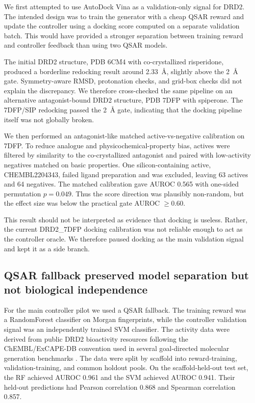 \documentclass[referee,lineno,pdflatex,sn-basic]{sn-jnl}
\theoremstyle{thmstyleone}%
\theoremstyle{thmstyletwo}%
\theoremstyle{thmstylethree}%
\begin{document}
We first attempted to use AutoDock Vina as a validation-only signal for DRD2. The intended design was to train the generator with a cheap QSAR reward and update the controller using a docking score computed on a separate validation batch. This would have provided a stronger separation between training reward and controller feedback than using two QSAR models.

The initial DRD2 structure, PDB 6CM4 with co-crystallized risperidone, produced a borderline redocking result around 2.33~\AA, slightly above the 2~\AA{} gate. Symmetry-aware RMSD, protonation checks, and grid-box checks did not explain the discrepancy. We therefore cross-checked the same pipeline on an alternative antagonist-bound DRD2 structure, PDB 7DFP with spiperone. The 7DFP/SIP redocking passed the 2~\AA{} gate, indicating that the docking pipeline itself was not globally broken.

We then performed an antagonist-like matched active-vs-negative calibration on 7DFP. To reduce analogue and physicochemical-property bias, actives were filtered by similarity to the co-crystallized antagonist and paired with low-activity negatives matched on basic properties. One silicon-containing active, CHEMBL2204343, failed ligand preparation and was excluded, leaving 63 actives and 64 negatives. The matched calibration gave AUROC 0.565 with one-sided permutation $p=0.049$. Thus the score direction was plausibly non-random, but the effect size was below the practical gate AUROC $\geq 0.60$.

This result should not be interpreted as evidence that docking is useless. Rather, the current DRD2\_7DFP docking calibration was not reliable enough to act as the controller oracle. We therefore paused docking as the main validation signal and kept it as a side branch.

\subsection{QSAR fallback preserved model separation but not biological independence}\label{subsec:qsar}

For the main controller pilot we used a QSAR fallback. The training reward was a RandomForest classifier on Morgan fingerprints, while the controller validation signal was an independently trained SVM classifier. The activity data were derived from public DRD2 bioactivity resources following the ChEMBL/ExCAPE-DB convention used in several goal-directed molecular generation benchmarks \cite{ref-chembl,ref-excape,ref-gcpn,ref-moldqn}. The data were split by scaffold into reward-training, validation-training, and common holdout pools. On the scaffold-held-out test set, the RF achieved AUROC 0.961 and the SVM achieved AUROC 0.941. Their held-out predictions had Pearson correlation 0.868 and Spearman correlation 0.857.
\end{document}
